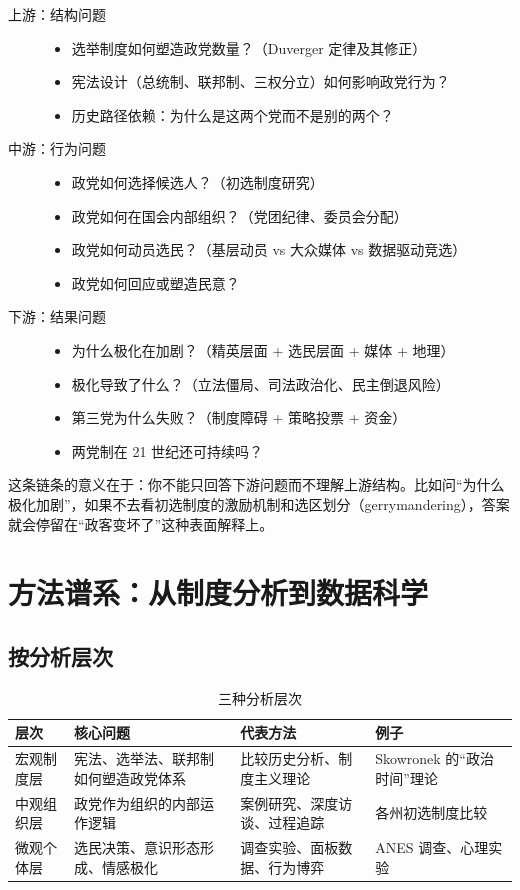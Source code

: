 \documentclass[12pt,a4paper]{ctexart}
\begin{document}
\begin{description}
  \item[上游：结构问题]
  \begin{itemize}
    \item 选举制度如何塑造政党数量？（Duverger 定律及其修正）
    \item 宪法设计（总统制、联邦制、三权分立）如何影响政党行为？
    \item 历史路径依赖：为什么是这两个党而不是别的两个？
  \end{itemize}
  \item[中游：行为问题]
  \begin{itemize}
    \item 政党如何选择候选人？（初选制度研究）
    \item 政党如何在国会内部组织？（党团纪律、委员会分配）
    \item 政党如何动员选民？（基层动员 vs 大众媒体 vs 数据驱动竞选）
    \item 政党如何回应或塑造民意？
  \end{itemize}
  \item[下游：结果问题]
  \begin{itemize}
    \item 为什么极化在加剧？（精英层面 + 选民层面 + 媒体 + 地理）
    \item 极化导致了什么？（立法僵局、司法政治化、民主倒退风险）
    \item 第三党为什么失败？（制度障碍 + 策略投票 + 资金）
    \item 两党制在 21 世纪还可持续吗？
  \end{itemize}
\end{description}

这条链条的意义在于：你不能只回答下游问题而不理解上游结构。比如问``为什么极化加剧''，如果不去看初选制度的激励机制和选区划分（gerrymandering），答案就会停留在``政客变坏了''这种表面解释上。

\section{方法谱系：从制度分析到数据科学}

\subsection{按分析层次}

\begin{table}[h]
\centering
\caption{三种分析层次}
\begin{tabular}{@{}lp{4.6cm}p{4.2cm}p{5.4cm}@{}}
\toprule
\textbf{层次} & \textbf{核心问题} & \textbf{代表方法} & \textbf{例子} \\
\midrule
宏观制度层 & 宪法、选举法、联邦制如何塑造政党体系 & 比较历史分析、制度主义理论 & Skowronek 的``政治时间''理论 \\
中观组织层 & 政党作为组织的内部运作逻辑 & 案例研究、深度访谈、过程追踪 & 各州初选制度比较 \\
微观个体层 & 选民决策、意识形态形成、情感极化 & 调查实验、面板数据、行为博弈 & ANES 调查、心理实验 \\
\bottomrule
\end{tabular}
\end{table}
\end{document}
